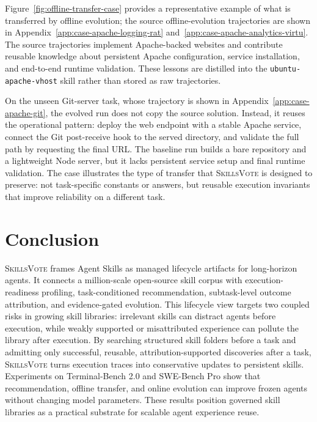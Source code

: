 \documentclass{llmxive}
\providecommand{\ours}{\textsc{SkillsVote}\xspace}
\begin{document}
Figure~\ref{fig:offline-transfer-case} provides a representative example of what is transferred by offline evolution; the source offline-evolution trajectories are shown in Appendix~\ref{app:case-apache-logging-rat} and~\ref{app:case-apache-analytics-virtu}. The source trajectories implement Apache-backed websites and contribute reusable knowledge about persistent Apache configuration, service installation, and end-to-end runtime validation. These lessons are distilled into the \texttt{ubuntu-apache-vhost} skill rather than stored as raw trajectories.

On the unseen Git-server task, whose trajectory is shown in Appendix~\ref{app:case-apache-git}, the evolved run does not copy the source solution. Instead, it reuses the operational pattern: deploy the web endpoint with a stable Apache service, connect the Git post-receive hook to the served directory, and validate the full path by requesting the final URL. The baseline run builds a bare repository and a lightweight Node server, but it lacks persistent service setup and final runtime validation. The case illustrates the type of transfer that \ours is designed to preserve: not task-specific constants or answers, but reusable execution invariants that improve reliability on a different task.

\FloatBarrier


\section{Conclusion}
\ours frames Agent Skills as managed lifecycle artifacts for long-horizon agents. It connects a million-scale open-source skill corpus with execution-readiness profiling, task-conditioned recommendation, subtask-level outcome attribution, and evidence-gated evolution. This lifecycle view targets two coupled risks in growing skill libraries: irrelevant skills can distract agents before execution, while weakly supported or misattributed experience can pollute the library after execution. By searching structured skill folders before a task and admitting only successful, reusable, attribution-supported discoveries after a task, \ours turns execution traces into conservative updates to persistent skills. Experiments on Terminal-Bench 2.0 and SWE-Bench Pro show that recommendation, offline transfer, and online evolution can improve frozen agents without changing model parameters. These results position governed skill libraries as a practical substrate for scalable agent experience reuse.
\end{document}
